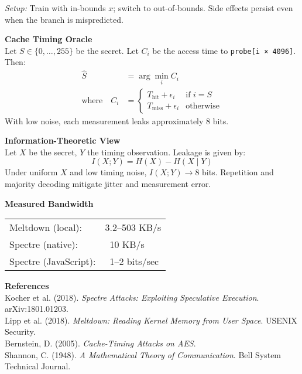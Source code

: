 \begin{technical}
\textit{Setup:} Train with in-bounds \( x \); switch to out-of-bounds. Side effects persist even when the branch is mispredicted.

\vspace{0.4em}
\textbf{Cache Timing Oracle}\\[0.5em]
Let \( S \in \{0,\dots,255\} \) be the secret. Let \( C_i \) be the access time to \texttt{probe[i × 4096]}. Then:
\[
\begin{aligned}
\hat{S} &= \arg\min_i C_i \\
\text{where} \quad
C_i &= 
\begin{cases}
T_\text{hit} + \epsilon_i & \text{if } i = S \\
T_\text{miss} + \epsilon_i & \text{otherwise}
\end{cases}
\end{aligned}
\]
With low noise, each measurement leaks approximately 8 bits.

\vspace{0.4em}
\textbf{Information-Theoretic View}\\[0.5em]
Let \( X \) be the secret, \( Y \) the timing observation. Leakage is given by:
\[
I(X; Y) = H(X) - H(X \mid Y)
\]
Under uniform \( X \) and low timing noise, \( I(X; Y) \to 8 \) bits. Repetition and majority decoding mitigate jitter and measurement error.

\vspace{0.4em}
\textbf{Measured Bandwidth}\\[0.5em]
\begin{tabular}{@{}ll@{}}
Meltdown (local):     & 3.2–503 KB/s \\
Spectre (native):     & ~10 KB/s \\
Spectre (JavaScript): & ~1–2 bits/sec \\
\end{tabular}

\vspace{0.5em}
\textbf{References}\\
Kocher et al. (2018). \textit{Spectre Attacks: Exploiting Speculative Execution}. arXiv:1801.01203.\\
Lipp et al. (2018). \textit{Meltdown: Reading Kernel Memory from User Space}. USENIX Security.\\
Bernstein, D. (2005). \textit{Cache-Timing Attacks on AES}.\\
Shannon, C. (1948). \textit{A Mathematical Theory of Communication}. Bell System Technical Journal.
\end{technical}
